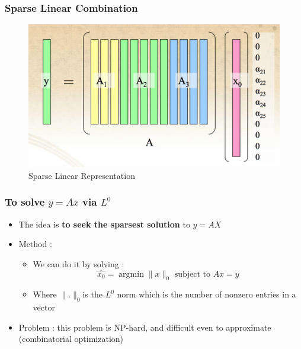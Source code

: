 \documentclass{beamer}
\DeclareMathOperator{\argmin}{argmin} %
\begin{document}
\begin{frame}

		\frametitle{Sparse Linear Combination}		
			
			\begin{figure}[!ht]
			\begin{center}
			\includegraphics[scale=0.5]{sparse.png}
			\end{center}
			\caption{Sparse Linear Representation}
			\label{ma}
			\end{figure}

\end{frame}

		
\begin{frame}

		\frametitle{To solve $y=Ax$ via $L^{0}$}		
			
\begin{itemize}
\item The idea is \textbf{to seek the sparsest solution} to $y=AX$
\item Method :
	\begin{itemize}
	\item We can do it by solving : 
	$$ \hat{x_{0}}= \argmin \|x\|_{0}  \mbox{ subject to } Ax=y$$
	\item Where $\|.\|_{0} $is the $L^{0}$ norm which is the number of nonzero entries in a vector
	\end{itemize}
\item Problem : this problem is NP-hard, and difficult even to approximate (combinatorial optimization)


\end{itemize}

\end{frame}
		
\end{document}
